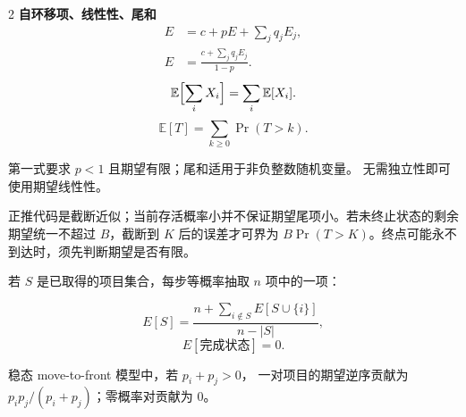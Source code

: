 \documentclass[UTF8,fontset=fandol,a4paper,twoside]{ctexart}
\newcommand{\note}[1]{{\fontsize{10}{12}\selectfont #1\par}}
\begin{document}
\begin{multicols}{2}
\textbf{自环移项、线性性、尾和}
\[
\begin{aligned}
E&=c+pE+\sum_jq_jE_j,\\
E&=\frac{c+\sum_jq_jE_j}{1-p}.
\end{aligned}
\]
\[
\mathbb E\Bigl[\sum_iX_i\Bigr]=\sum_i\mathbb E[X_i].
\]
\[
\mathbb E[T]=\sum_{k\ge0}\Pr(T>k).
\]
\note{第一式要求 $p<1$ 且期望有限；尾和适用于非负整数随机变量。
无需独立性即可使用期望线性性。}
\note{正推代码是截断近似；当前存活概率小并不保证期望尾项小。若未终止状态的剩余期望统一不超过 $B$，截断到 $K$ 后的误差才可界为 $B\Pr(T>K)$。终点可能永不到达时，须先判断期望是否有限。}
\note{若 $S$ 是已取得的项目集合，每步等概率抽取 $n$ 项中的一项：}
\[
E[S]=\frac{n+\sum_{i\notin S}E[S\cup\{i\}]}{n-|S|},
\]
\[
E[\text{完成状态}]=0.
\]
\note{稳态 move-to-front 模型中，若 $p_i+p_j>0$，
一对项目的期望逆序贡献为 $p_ip_j/(p_i+p_j)$；零概率对贡献为 0。}


\end{multicols}
\end{document}
